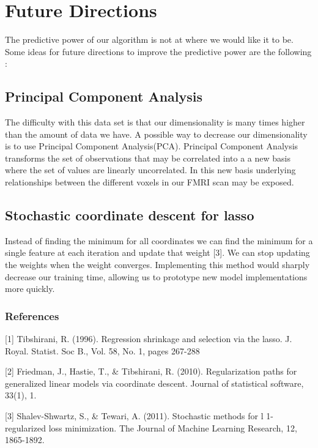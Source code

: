 \documentclass{article} %
\begin{document}
\section{Future Directions}

The predictive power of our algorithm is not at where we would like it to be. Some ideas for future directions to improve the predictive power are the following :

\subsection{Principal Component Analysis}
The difficulty with this data set is that our dimensionality is many times higher than the amount of data we have. A possible way to decrease our dimensionality is to use Principal Component Analysis(PCA).  Principal Component Analysis transforms the set of observations that may be correlated into a a new basis where the set of values are linearly uncorrelated. In this new basis underlying relationships between the different voxels in our FMRI scan may be exposed. 


\subsection{Stochastic coordinate descent for lasso}
Instead of finding the minimum for all coordinates we can find the minimum for a single feature at each iteration and update that weight [3]. We can stop updating the weights when the weight converges. Implementing this method would sharply decrease our training time, allowing us to prototype new model implementations more quickly.


\subsubsection*{References}

\small{
[1] Tibshirani, R. (1996). Regression shrinkage and selection via the lasso. J. Royal. Statist. Soc B., Vol. 58, No. 1, pages 267-288

[2] Friedman, J., Hastie, T., \& Tibshirani, R. (2010). Regularization paths for generalized linear models via coordinate descent. Journal of statistical software, 33(1), 1.

[3] Shalev-Shwartz, S., \& Tewari, A. (2011). Stochastic methods for l 1-regularized loss minimization. The Journal of Machine Learning Research, 12, 1865-1892.
}
\end{document}
